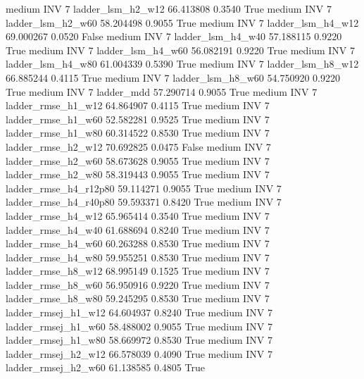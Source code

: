     medium      INV                 7      ladder_lsm_h2_w12  66.413808      0.3540    True
    medium      INV                 7      ladder_lsm_h2_w60  58.204498      0.9055    True
    medium      INV                 7      ladder_lsm_h4_w12  69.000267      0.0520   False
    medium      INV                 7      ladder_lsm_h4_w40  57.188115      0.9220    True
    medium      INV                 7      ladder_lsm_h4_w60  56.082191      0.9220    True
    medium      INV                 7      ladder_lsm_h4_w80  61.004339      0.5390    True
    medium      INV                 7      ladder_lsm_h8_w12  66.885244      0.4115    True
    medium      INV                 7      ladder_lsm_h8_w60  54.750920      0.9220    True
    medium      INV                 7             ladder_mdd  57.290714      0.9055    True
    medium      INV                 7     ladder_rmse_h1_w12  64.864907      0.4115    True
    medium      INV                 7     ladder_rmse_h1_w60  52.582281      0.9525    True
    medium      INV                 7     ladder_rmse_h1_w80  60.314522      0.8530    True
    medium      INV                 7     ladder_rmse_h2_w12  70.692825      0.0475   False
    medium      INV                 7     ladder_rmse_h2_w60  58.673628      0.9055    True
    medium      INV                 7     ladder_rmse_h2_w80  58.319443      0.9055    True
    medium      INV                 7  ladder_rmse_h4_r12p80  59.114271      0.9055    True
    medium      INV                 7  ladder_rmse_h4_r40p80  59.593371      0.8420    True
    medium      INV                 7     ladder_rmse_h4_w12  65.965414      0.3540    True
    medium      INV                 7     ladder_rmse_h4_w40  61.688694      0.8240    True
    medium      INV                 7     ladder_rmse_h4_w60  60.263288      0.8530    True
    medium      INV                 7     ladder_rmse_h4_w80  59.955251      0.8530    True
    medium      INV                 7     ladder_rmse_h8_w12  68.995149      0.1525    True
    medium      INV                 7     ladder_rmse_h8_w60  56.950916      0.9220    True
    medium      INV                 7     ladder_rmse_h8_w80  59.245295      0.8530    True
    medium      INV                 7    ladder_rmsej_h1_w12  64.604937      0.8240    True
    medium      INV                 7    ladder_rmsej_h1_w60  58.488002      0.9055    True
    medium      INV                 7    ladder_rmsej_h1_w80  58.669972      0.8530    True
    medium      INV                 7    ladder_rmsej_h2_w12  66.578039      0.4090    True
    medium      INV                 7    ladder_rmsej_h2_w60  61.138585      0.4805    True

